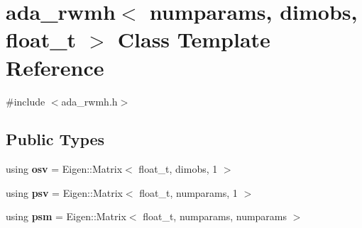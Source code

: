 \hypertarget{classada__rwmh}{}\section{ada\+\_\+rwmh$<$ numparams, dimobs, float\+\_\+t $>$ Class Template Reference}
\label{classada__rwmh}


{\ttfamily \#include $<$ada\+\_\+rwmh.\+h$>$}

\subsection*{Public Types}
\begin{DoxyCompactItemize}
\item 
\mbox{\label{classada__rwmh_aeb76bd00a699bb238958637c862c1056}} 
using {\bfseries osv} = Eigen\+::\+Matrix$<$ float\+\_\+t, dimobs, 1 $>$
\item 
\mbox{\label{classada__rwmh_aac7b75115f3e74764d44cb845bd17208}} 
using {\bfseries psv} = Eigen\+::\+Matrix$<$ float\+\_\+t, numparams, 1 $>$
\item 
\mbox{\label{classada__rwmh_a8259b89462a9f732bd8a6792a84903be}} 
using {\bfseries psm} = Eigen\+::\+Matrix$<$ float\+\_\+t, numparams, numparams $>$
\end{DoxyCompactItemize}
